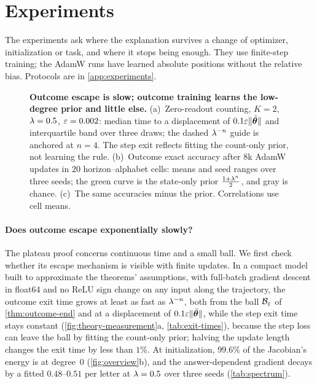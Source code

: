 \suppressfloats[t]
\section{Experiments}
\label{sec:experiments}
\label{sec:validation}

The experiments ask where the explanation survives a change of optimizer, initialization or task, and where it stops being enough.
They use finite-step training; the AdamW runs have learned absolute positions without the relative bias. Protocols are in \cref{app:experiments}.

\begin{figure}[t]
\centering
\resizebox{\linewidth}{!}{}
\caption{\textbf{Outcome escape is slow; outcome training learns the low-degree prior and little else.}
(a)~Zero-readout counting, $K=2$, $\lambda=0.5$, $\varepsilon=0.002$: median time to a displacement of $0.1\varepsilon\|\tilde{\bm\theta}\|$ and interquartile band over three draws; the dashed $\lambda^{-n}$ guide is anchored at $n=4$. The step exit reflects fitting the count-only prior, not learning the rule.
(b)~Outcome exact accuracy after $8$k AdamW updates in $20$ horizon--alphabet cells: means and seed ranges over three seeds; the green curve is the state-only prior $\frac{1+\lambda^n}{2}$, and gray is chance.
(c)~The same accuracies minus the prior. Correlations use cell means.}
\label{fig:theory-measurement}
\label{fig:lambda-grid}
\end{figure}

\paragraph{Does outcome escape exponentially slowly?} The plateau proof concerns continuous time and a small ball. We first check
whether its escape mechanism is visible with finite updates. In a compact model built to approximate the theorems' assumptions, with full-batch gradient descent
in float64 and no ReLU sign change on any input along the trajectory, the outcome exit time grows at least as fast as $\lambda^{-n}$, both from the
ball $\mathcal B_{\varepsilon}$ of \cref{thm:outcome-end} and at a displacement of $0.1\varepsilon\|\tilde{\bm\theta}\|$, while the step exit time stays
constant (\cref{fig:theory-measurement}a, \cref{tab:exit-times}), because the step loss can leave the ball by fitting the count-only prior;
halving the update length changes the exit time by less than $1\%$. At
initialization, $99.6\%$ of the Jacobian's energy is at degree~$0$ (\cref{fig:overview}b), and the answer-dependent
gradient decays by a fitted $0.48$--$0.51$ per letter at $\lambda=0.5$ over three seeds (\cref{tab:spectrum}).

